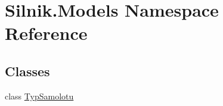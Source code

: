 \hypertarget{namespace_silnik_1_1_models}{}\section{Silnik.\+Models Namespace Reference}
\label{namespace_silnik_1_1_models}
\subsection*{Classes}
\begin{DoxyCompactItemize}
\item 
class \mbox{\hyperlink{class_silnik_1_1_models_1_1_typ_samolotu}{Typ\+Samolotu}}
\end{DoxyCompactItemize}
